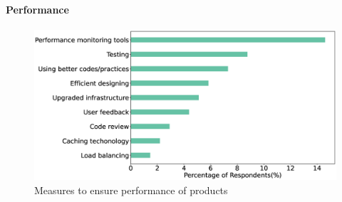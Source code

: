 

\paragraph{Performance}
\label{Performance}

\begin{figure}[h]
\centering
\includegraphics[scale=0.22]{Figures/Performance.eps} 
\caption{Measures to ensure performance of products}
\label{fig:Measures to ensure performance}
\end{figure}


